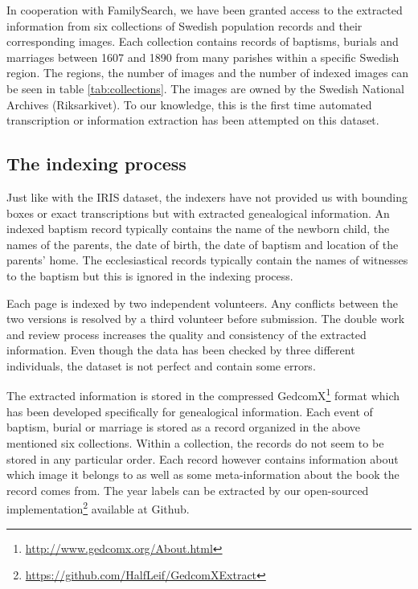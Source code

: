 

In cooperation with FamilySearch, we have been granted access to the extracted information from six collections of Swedish population records and their corresponding images.
Each collection contains records of baptisms, burials and marriages between 1607 and 1890 from many parishes within a specific Swedish region.
The regions, the number of images and the number of indexed images can be seen in table \ref{tab:collections}.
The images are owned by the Swedish National Archives (Riksarkivet).
To our knowledge, this is the first time automated transcription or information extraction has been attempted on this dataset.



\subsection{The indexing process}

Just like with the IRIS dataset, the indexers have not provided us with bounding boxes or exact transcriptions but with extracted genealogical information. An indexed baptism record typically contains the name of the newborn child, the names of the parents, the date of birth, the date of baptism and location of the parents' home. The ecclesiastical records typically contain the names of witnesses to the baptism but this is ignored in the indexing process.

Each page is indexed by two independent volunteers. Any conflicts between the two versions is resolved by a third volunteer before submission.
The double work and review process increases the quality and consistency of the extracted information. Even though the data has been checked by three different individuals, the dataset is not perfect and contain some errors.

The extracted information is stored in the compressed GedcomX\footnote{\url{http://www.gedcomx.org/About.html}} format which has been developed specifically for genealogical information.
Each event of baptism, burial or marriage is stored as a record organized in the above mentioned six collections. Within a collection, the records do not seem to be stored in any particular order. Each record however contains information about which image it belongs to as well as some meta-information about the book the record comes from. The year labels can be extracted by our open-sourced implementation\footnote{\url{https://github.com/HalfLeif/GedcomXExtract}} available at Github.

